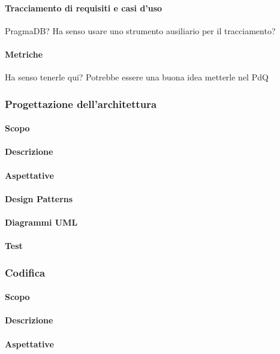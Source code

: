 \paragraph{Tracciamento di requisiti e casi d'uso}
PragmaDB? Ha senso usare uno strumento ausiliario per il tracciamento? 
\paragraph{Metriche}
Ha senso tenerle qui? Potrebbe essere una buona idea metterle nel PdQ

\subsubsection{Progettazione dell'architettura}
\paragraph{Scopo}
\paragraph{Descrizione}
\paragraph{Aspettative}
\paragraph{Design Patterns}
\paragraph{Diagrammi UML}
\paragraph{Test}

\subsubsection{Codifica}
\paragraph{Scopo}
\paragraph{Descrizione}
\paragraph{Aspettative}
